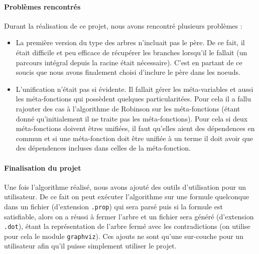 \documentclass{report}
\begin{document}
\paragraph{Problèmes rencontrés}
Durant la réalisation de ce projet, nous avons rencontré plusieurs problèmes :
\begin{itemize}
  \item La première version du type des arbres n'incluait pas le père. De ce fait, il était difficile et peu efficace de récupérer les branches lorsqu'il le fallait (un parcours intégral depuis la racine était nécessaire). C'est en partant de ce soucis que nous avons finalement choisi d'inclure le père dans les noeuds.
  \item L'unification n'était pas si évidente. Il fallait gérer les méta-variables et aussi les méta-fonctions qui possèdent quelques particularitées. Pour cela il a fallu rajouter des cas à l'algorithme de Robinson sur les méta-fonctions (étant donné qu'initialement il ne traite pas les méta-fonctions). Pour cela si deux méta-fonctions doivent êtres unifiées, il faut qu'elles aient des dépendences en commun et si une méta-fonction doit être unifiée à un terme il doit avoir que des dépendences incluses dans celles de la méta-fonction.
\end{itemize}

\paragraph{Finalisation du projet}
Une fois l'algorithme réalisé, nous avons ajouté des outils d'utilisation pour un utilisateur. De ce fait on peut exécuter l'algorithme sur une formule quelconque dans un fichier (d'extension \verb|.prop|) qui sera parsé puis si la formule est satisfiable, alors on a réussi à fermer l'arbre et un fichier sera généré (d'extension \verb|.dot|), étant la représentation de l'arbre fermé avec les contradictions (on utilise pour cela le module \verb|graphviz|). Ces ajouts ne sont qu'une sur-couche pour un utilisateur afin qu'il puisse simplement utiliser le projet.
\end{document}
